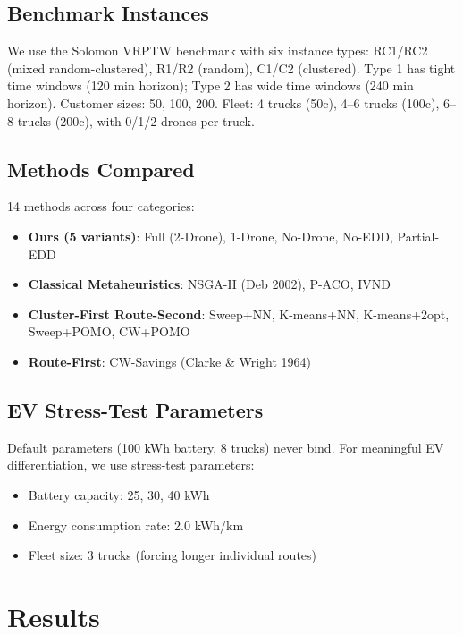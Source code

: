 \documentclass[11pt,a4paper]{article}
\begin{document}
\subsection{Benchmark Instances}

We use the Solomon VRPTW benchmark with six instance types:
RC1/RC2 (mixed random-clustered), R1/R2 (random), C1/C2 (clustered).
Type 1 has tight time windows (120 min horizon); Type 2 has wide time windows
(240 min horizon). Customer sizes: 50, 100, 200. Fleet: 4 trucks (50c), 4--6 trucks
(100c), 6--8 trucks (200c), with 0/1/2 drones per truck.

\subsection{Methods Compared}

14 methods across four categories:
\begin{itemize}
    \item \textbf{Ours (5 variants)}: Full (2-Drone), 1-Drone, No-Drone, No-EDD, Partial-EDD
    \item \textbf{Classical Metaheuristics}: NSGA-II (Deb 2002), P-ACO, IVND
    \item \textbf{Cluster-First Route-Second}: Sweep+NN, K-means+NN, K-means+2opt,
          Sweep+POMO, CW+POMO
    \item \textbf{Route-First}: CW-Savings (Clarke \& Wright 1964)
\end{itemize}

\subsection{EV Stress-Test Parameters}

Default parameters (100 kWh battery, 8 trucks) never bind. For meaningful EV
differentiation, we use stress-test parameters:
\begin{itemize}
    \item Battery capacity: 25, 30, 40 kWh
    \item Energy consumption rate: 2.0 kWh/km
    \item Fleet size: 3 trucks (forcing longer individual routes)
\end{itemize}

\section{Results}
\end{document}
